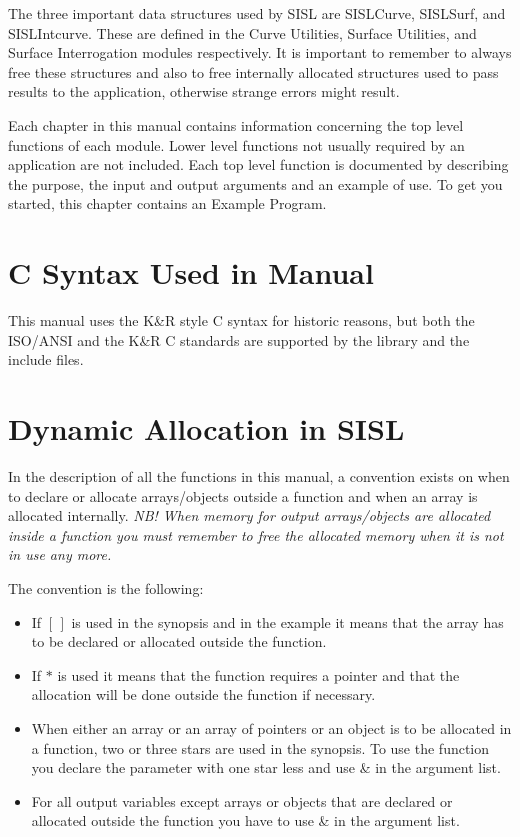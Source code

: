 The three important data structures used by SISL are SISLCurve,
SISLSurf, and SISLIntcurve. These are defined in the Curve Utilities,
Surface Utilities, and Surface Interrogation modules respectively. It is
important to remember to always free these structures and also to free
internally allocated structures used to pass results to the application,
otherwise strange errors might result.

Each chapter in this manual contains information concerning the top
level functions of each module. Lower level functions not usually
required by an application are not included. Each top level function is
documented by describing the purpose, the input and output arguments and
an example of use. To get you started, this chapter contains an Example
Program.


\section{\label{syntax}C Syntax Used in Manual}
This manual uses the K\&R style C syntax for historic reasons, but both
the ISO/ANSI and the K\&R C standards are supported by the library and
the include files.

\section{\label{dynamic}Dynamic Allocation in SISL}
In the description of all the functions in this manual, a
convention exists on when to declare or allocate arrays/objects outside a
function and when an array is allocated internally.
{\em NB! When memory for output arrays/objects are allocated inside a function you
must remember to free the allocated memory when it is not in use any
more.}

The convention is the following:
\begin{itemize}
\item If $[\,]$ is used in the synopsis and in the example it means
that the array has to be declared or allocated outside the function.
\item If $*$ is used it means that the function requires a
pointer and that the allocation will be done outside the function if necessary.
\item When either an array or an array of pointers or an object is to be
allocated in a function, two or three stars are used in the
synopsis.
To use the function you declare the parameter with one star less and use  \&
in the argument list.
\item For all output variables except arrays or objects
that are declared or allocated  outside the function you have to use \&
in the argument list.
\end{itemize}


